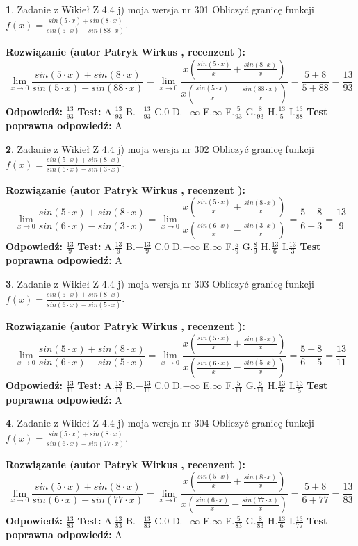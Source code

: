 \documentclass[12pt, a4paper]{article}
\theoremstyle{definition} %
\newtheorem{zad}{}
\newcommand{\zadStart}[1]{\begin{zad}#1\newline}
\newcommand{\zadStop}{\end{zad}}
\newcommand{\rozwStart}[2]{\noindent \textbf{Rozwiązanie (autor #1 , recenzent #2): }\newline}
\newcommand{\rozwStop}{\newline}
\newcommand{\odpStart}{\noindent \textbf{Odpowiedź:}\newline}
\newcommand{\odpStop}{\newline}
\newcommand{\testStart}{\noindent \textbf{Test:}\newline}
\newcommand{\testStop}{\newline}
\newcommand{\kluczStart}{\noindent \textbf{Test poprawna odpowiedź:}\newline}
\newcommand{\kluczStop}{\newline}
\begin{document}
\zadStart{Zadanie z Wikieł Z 4.4 j) moja wersja nr 301}
Obliczyć granicę funkcji $f(x)=\frac{sin(5\cdot x) +sin(8\cdot x)}{sin(5\cdot x) -sin(88\cdot x)}$.
\zadStop
\rozwStart{Patryk Wirkus}{}
$$\lim\limits_{x\to 0}\frac{sin(5\cdot x) +sin(8\cdot x)}{sin(5\cdot x) -sin(88\cdot x)}=\lim\limits_{x\to 0}\frac{x(\frac{sin(5\cdot x)}{x}+\frac{sin(8\cdot x)}{x})}{x(\frac{sin(5\cdot x)}{x}-\frac{sin(88\cdot x)}{x})}=\frac{5+8}{5+88} = \frac{13}{93}$$
\rozwStop
\odpStart
$\frac{13}{93}$
\odpStop
\testStart
A.$\frac{13}{93}$
B.$-\frac{13}{93}$
C.$0$
D.$-\infty$
E.$\infty$
F.$\frac{5}{93}$
G.$\frac{8}{93}$
H.$\frac{13}{5}$
I.$\frac{13}{88}$
\testStop
\kluczStart
A
\kluczStop



\zadStart{Zadanie z Wikieł Z 4.4 j) moja wersja nr 302}
Obliczyć granicę funkcji $f(x)=\frac{sin(5\cdot x) +sin(8\cdot x)}{sin(6\cdot x) -sin(3\cdot x)}$.
\zadStop
\rozwStart{Patryk Wirkus}{}
$$\lim\limits_{x\to 0}\frac{sin(5\cdot x) +sin(8\cdot x)}{sin(6\cdot x) -sin(3\cdot x)}=\lim\limits_{x\to 0}\frac{x(\frac{sin(5\cdot x)}{x}+\frac{sin(8\cdot x)}{x})}{x(\frac{sin(6\cdot x)}{x}-\frac{sin(3\cdot x)}{x})}=\frac{5+8}{6+3} = \frac{13}{9}$$
\rozwStop
\odpStart
$\frac{13}{9}$
\odpStop
\testStart
A.$\frac{13}{9}$
B.$-\frac{13}{9}$
C.$0$
D.$-\infty$
E.$\infty$
F.$\frac{5}{9}$
G.$\frac{8}{9}$
H.$\frac{13}{6}$
I.$\frac{13}{3}$
\testStop
\kluczStart
A
\kluczStop



\zadStart{Zadanie z Wikieł Z 4.4 j) moja wersja nr 303}
Obliczyć granicę funkcji $f(x)=\frac{sin(5\cdot x) +sin(8\cdot x)}{sin(6\cdot x) -sin(5\cdot x)}$.
\zadStop
\rozwStart{Patryk Wirkus}{}
$$\lim\limits_{x\to 0}\frac{sin(5\cdot x) +sin(8\cdot x)}{sin(6\cdot x) -sin(5\cdot x)}=\lim\limits_{x\to 0}\frac{x(\frac{sin(5\cdot x)}{x}+\frac{sin(8\cdot x)}{x})}{x(\frac{sin(6\cdot x)}{x}-\frac{sin(5\cdot x)}{x})}=\frac{5+8}{6+5} = \frac{13}{11}$$
\rozwStop
\odpStart
$\frac{13}{11}$
\odpStop
\testStart
A.$\frac{13}{11}$
B.$-\frac{13}{11}$
C.$0$
D.$-\infty$
E.$\infty$
F.$\frac{5}{11}$
G.$\frac{8}{11}$
H.$\frac{13}{6}$
I.$\frac{13}{5}$
\testStop
\kluczStart
A
\kluczStop



\zadStart{Zadanie z Wikieł Z 4.4 j) moja wersja nr 304}
Obliczyć granicę funkcji $f(x)=\frac{sin(5\cdot x) +sin(8\cdot x)}{sin(6\cdot x) -sin(77\cdot x)}$.
\zadStop
\rozwStart{Patryk Wirkus}{}
$$\lim\limits_{x\to 0}\frac{sin(5\cdot x) +sin(8\cdot x)}{sin(6\cdot x) -sin(77\cdot x)}=\lim\limits_{x\to 0}\frac{x(\frac{sin(5\cdot x)}{x}+\frac{sin(8\cdot x)}{x})}{x(\frac{sin(6\cdot x)}{x}-\frac{sin(77\cdot x)}{x})}=\frac{5+8}{6+77} = \frac{13}{83}$$
\rozwStop
\odpStart
$\frac{13}{83}$
\odpStop
\testStart
A.$\frac{13}{83}$
B.$-\frac{13}{83}$
C.$0$
D.$-\infty$
E.$\infty$
F.$\frac{5}{83}$
G.$\frac{8}{83}$
H.$\frac{13}{6}$
I.$\frac{13}{77}$
\testStop
\kluczStart
A
\kluczStop
\end{document}
